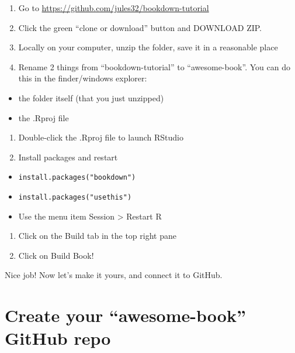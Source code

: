 \documentclass[
]{book}
\providecommand{\tightlist}{%
  \setlength{\itemsep}{0pt}\setlength{\parskip}{0pt}}
\begin{document}
\begin{enumerate}
\def\labelenumi{\arabic{enumi}.}
\tightlist
\item
  Go to \url{https://github.com/jules32/bookdown-tutorial}
\item
  Click the green ``clone or download'' button and DOWNLOAD ZIP.
\item
  Locally on your computer, unzip the folder, save it in a reasonable place
\item
  Rename 2 things from ``bookdown-tutorial'' to ``awesome-book''. You can do this in the finder/windows explorer:
\end{enumerate}

\begin{itemize}
\tightlist
\item
  the folder itself (that you just unzipped)
\item
  the .Rproj file
\end{itemize}

\begin{enumerate}
\def\labelenumi{\arabic{enumi}.}
\tightlist
\item
  Double-click the .Rproj file to launch RStudio
\item
  Install packages and restart
\end{enumerate}

\begin{itemize}
\tightlist
\item
  \texttt{install.packages("bookdown")}~\\
\item
  \texttt{install.packages("usethis")}~\\
\item
  Use the menu item Session \textgreater{} Restart R\\
\end{itemize}

\begin{enumerate}
\def\labelenumi{\arabic{enumi}.}
\tightlist
\item
  Click on the Build tab in the top right pane
\item
  Click on Build Book!
\end{enumerate}

Nice job! Now let's make it yours, and connect it to GitHub.

\hypertarget{create-your-awesome-book-github-repo}{%
\section{Create your ``awesome-book'' GitHub repo}\label{create-your-awesome-book-github-repo}}
\end{document}
